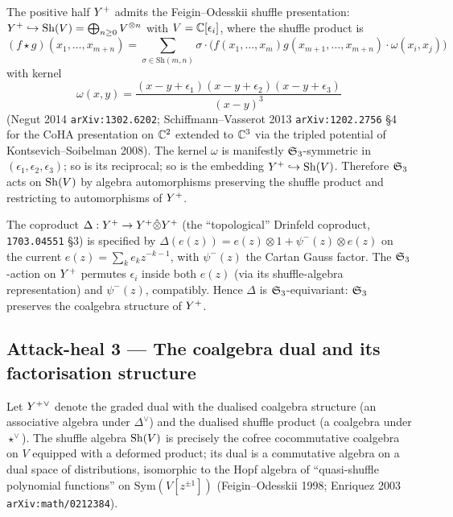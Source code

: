 The positive half $Y^{+}$ admits the Feigin--Odesskii shuffle
presentation: $Y^{+} \hookrightarrow \mathrm{Sh}(V) = \bigoplus_{n \geq 0}
V^{\otimes n}$ with $V = \mathbb{C}[\epsilon_{i}]$, where the shuffle product is
\[
  (f \star g)(x_{1}, \dots, x_{m+n})
   = \sum_{\sigma \in \mathrm{Sh}(m, n)}
       \sigma \cdot \bigl(
         f(x_{1}, \dots, x_{m}) g(x_{m+1}, \dots, x_{m+n})
         \cdot \omega(x_{i}, x_{j})
       \bigr)
\]
with kernel
\[
  \omega(x, y)
   = \frac{(x - y + \epsilon_{1})(x - y + \epsilon_{2})
           (x - y + \epsilon_{3})}
          {(x - y)^{3}}
\]
(Negut 2014 \texttt{arXiv:1302.6202}; Schiffmann--Vasserot 2013
\texttt{arXiv:1202.2756} \S4 for the CoHA presentation on $\mathbb{C}^{2}$
extended to $\mathbb{C}^{3}$ via the tripled potential of Kontsevich--Soibelman
2008).  The kernel $\omega$ is manifestly
$\mathfrak{S}_{3}$-symmetric in $(\epsilon_{1}, \epsilon_{2}, \epsilon_{3})$; so
is its reciprocal; so is the embedding $Y^{+} \hookrightarrow \mathrm{Sh}(V)$.
Therefore $\mathfrak{S}_{3}$ acts on $\mathrm{Sh}(V)$ by algebra automorphisms preserving
the shuffle product and restricting to automorphisms of $Y^{+}$.

The coproduct $\Delta: Y^{+} \to Y^{+} \hat{\otimes} Y^{+}$
(the ``topological'' Drinfeld coproduct, \texttt{1703.04551} \S3) is
specified by $\Delta(e(z)) = e(z) \otimes 1 +
\psi^{-}(z) \otimes e(z)$ on the current $e(z) = \sum_{k} e_{k} z^{-k-1}$,
with $\psi^{-}(z)$ the Cartan Gauss factor.  The $\mathfrak{S}_{3}$-action on
$Y^{+}$ permutes $\epsilon_{i}$ inside both $e(z)$ (via its
shuffle-algebra representation) and $\psi^{-}(z)$, compatibly.
Hence $\Delta$ is $\mathfrak{S}_{3}$-equivariant: $\mathfrak{S}_{3}$ preserves the
coalgebra structure of $Y^{+}$.

\subsection*{Attack-heal 3 --- The coalgebra dual and its factorisation
structure}

Let $Y^{+}{}^{\vee}$ denote the graded dual with the dualised coalgebra
structure (an associative algebra under $\Delta^{\vee}$) and the
dualised shuffle product (a coalgebra under $\star^{\vee}$).  The shuffle
algebra $\mathrm{Sh}(V)$ is precisely the cofree cocommutative coalgebra on $V$
equipped with a deformed product; its dual is a commutative algebra
on a dual space of distributions, isomorphic to the Hopf algebra of
``quasi-shuffle polynomial functions'' on $\mathrm{Sym}(V[z^{\pm 1}])$
(Feigin--Odesskii 1998; Enriquez 2003 \texttt{arXiv:math/0212384}).


